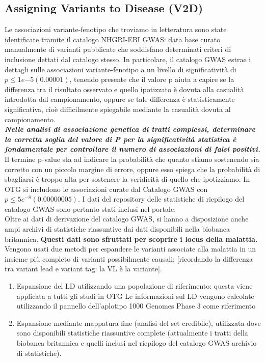 \documentclass{article}
\begin{document}
\subsection{Assigning Variants to Disease (V2D)}
Le associazioni variante-fenotipo che troviamo in letteratura sono state identificate tramite il catalogo NHGRI-EBI GWAS: data base curato manualmente di varianti pubblicate che soddisfano determinati criteri di inclusione dettati dal catalogo stesso.
In particolare, il catalogo GWAS estrae i dettagli sulle associazioni variante-fenotipo a un livello di significatività di $p \leq 1e{-5} (0.00001)$, tenendo presente che il valore p aiuta a capire se la differenza tra il risultato osservato e quello ipotizzato è dovuta alla casualità introdotta dal campionamento, oppure se tale differenza è statisticamente significativa, cioè difficilmente spiegabile mediante la casualità dovuta al campionamento.\\
\textit{\textbf{Nelle analisi di associazione genetica di tratti complessi, determinare la corretta soglia del valore di
 P per la significatività statistica è fondamentale per controllare il numero di associazioni di falsi positivi.}}\\
Il termine p-value sta ad indicare la probabilità che quanto stiamo sostenendo sia corretto con un piccolo margine di errore, oppure esso spiega che la probabilità di sbagliarsi è troppo alta per sostenere la veridicità di quello che ipotizziamo.
In OTG si includono le associazioni curate dal Catalogo GWAS con $p \leq 5e^{-8} (0.00000005)$.
I dati del repository delle statistiche di riepilogo del catalogo GWAS sono pertanto stati inclusi nel portale.\\
Oltre ai dati di derivazione del catalogo GWAS, si hanno a disposizione anche ampi archivi di statistiche riassuntive dai dati disponibili nella biobanca britannica.
\textbf{Questi dati sono sfruttati per scoprire i locus della malattia.}\\
Vengono usati due metodi per espandere le varianti associate alla malattia in un insieme più completo di varianti possibilmente causali:
[ricordando la differenza tra variant lead e variant tag: la VL è la variante].
\begin{enumerate}
    \item Espansione del LD utilizzando una popolazione di riferimento: questa viene applicata a tutti gli studi in OTG
        \subitem Le informazioni sul LD vengono calcolate utilizzando il pannello dell'aplotipo 1000 Genomes Phase 3 come riferimento
    \item Espansione mediante mappatura fine (analisi del set credibile), utilizzata dove sono disponibili statistiche riassuntive complete (attualmente i tratti della biobanca britannica e quelli inclusi nel riepilogo del catalogo GWAS archivio di statistiche).
\end{enumerate}
\end{document}

